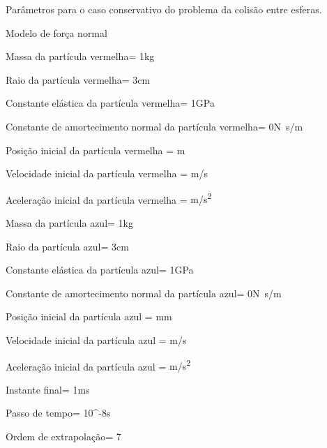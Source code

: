 \begin{table}[H]
\centering
\caption{Parâmetros para o caso conservativo do problema da colisão entre esferas.}
\label{tab:colliding_spheres:conservative:parameters}
\begin{parametersdesc}{\textwidth}
	\item{Modelo de força normal}{}{\emptyUnit}
	\hline
	\item{Massa da partícula vermelha}{\redMass = 1}{\si\kilogram}
	\item{Raio da partícula vermelha}{\redRadius = 3}{\si\centi\metre}
	\item{Constante elástica da partícula vermelha}{\redElasticModulus = 1}{\si[per-mode=symbol]{\giga\pascal}}
	\item{Constante de amortecimento normal da partícula vermelha}{\redNormalDampingConstant = 0}{\si[per-mode=symbol]{\newton\second\per\meter}}
	\hline
	\item{Posição inicial da partícula vermelha}{\initial{\redPosition} = }{\si{\metre}}
	\item{Velocidade inicial da partícula vermelha}{\initial{\redVelocity} = }{\si[per-mode=symbol]{\metre\per\second}}
	\item{Aceleração inicial da partícula vermelha}{\initial{\redAcceleration} = }{\si[per-mode=symbol]{\metre\per\square\second}}
	\hline
	\item{Massa da partícula azul}{\blueMass = 1}{\si\kilogram}
	\item{Raio da partícula azul}{\blueRadius = 3}{\si\centi\metre}
	\item{Constante elástica da partícula azul}{\blueElasticModulus = 1}{\si[per-mode=symbol]{\giga\pascal}}
	\item{Constante de amortecimento normal da partícula azul}{\blueNormalDampingConstant = 0}{\si[per-mode=symbol]{\newton\second\per\meter}}
	\hline
	\item{Posição inicial da partícula azul}{\initial{\bluePosition} = }{\si{\milli\metre}}
	\item{Velocidade inicial da partícula azul}{\initial{\blueVelocity} = }{\si[per-mode=symbol]{\metre\per\second}}
	\item{Aceleração inicial da partícula azul}{\initial{\blueAcceleration} = }{\si[per-mode=symbol]{\metre\per\square\second}}
	\hline
	\item{Instante final}{\finalInstant = 1}{\si\milli\second} 
	\item{Passo de tempo}{\Dt = 10^{-8}}{\si\second}
	\item{Ordem de extrapolação}{\taylorOrder = 7}{\emptyUnit}
\end{parametersdesc}
\sourceMe 
\end{table}

